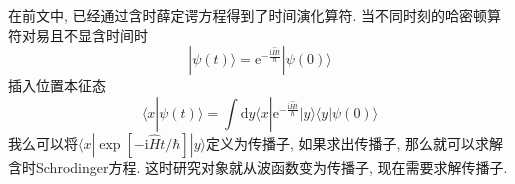         在前文中, 已经通过含时薛定谔方程得到了时间演化算符. 当不同时刻的哈密顿算符对易且不显含时间时
        \begin{equation}
            | \psi(t) \rangle = \mathrm{e}^{-\frac {\mathrm{i}\hat{H}t}{\hbar}} | \psi(0) \rangle
        \end{equation}
        插入位置本征态
        \begin{equation}
            \langle x | \psi(t) \rangle = \int \mathrm{d} y \langle x | \mathrm{e}^{-\frac {\mathrm{i}\hat{H}t}{\hbar}} | y \rangle  \langle y | \psi(0) \rangle
        \end{equation}
        我么可以将$\langle x | \exp[-\mathrm{i}\hat{H}t / \hbar] | y \rangle$定义为传播子, 如果求出传播子, 那么就可以求解含时Schrodinger方程. 这时研究对象就从波函数变为传播子, 现在需要求解传播子. 

